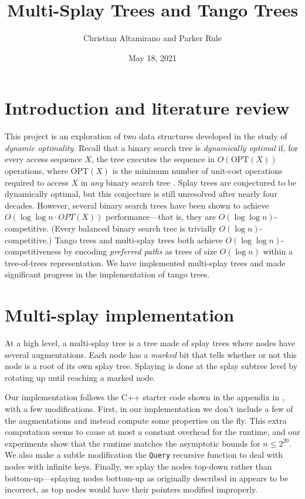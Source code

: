 \documentclass{article}
\title{Multi-Splay Trees and Tango Trees}
\author{Christian Altamirano and Parker Rule}
\date{May 18, 2021}
\newcommand{\OPT}{\text{OPT}}
\begin{document}
\maketitle

\section{Introduction and literature review}
This project is an exploration of two data structures developed in the study of \emph{dynamic optimality}. Recall that a binary search tree is \emph{dynamically optimal} if, for every access sequence $X$, the tree executes the sequence in $O(\OPT(X))$ operations, where $\OPT(X)$ is the minimum number of unit-cost operations required to access $X$ in \emph{any} binary search tree \cite{demaine2007dynamic}. Splay trees \cite{sleator1985self} are conjectured to be dynamically optimal, but this conjecture is still unresolved after nearly four decades. However, several binary search trees have been shown to achieve $O(\log \log n \cdot OPT(X))$ performance---that is, they are $O(\log \log n)$-competitive. (Every balanced binary search tree is trivially $O(\log n)$-competitive.) Tango trees \cite{demaine2007dynamic} and multi-splay trees \cite{sleator2004dynamic, daniel2006log, derryberry2009properties} both achieve $O(\log \log n)$-competitiveness by encoding \emph{preferred paths} as trees of size $O(\log n)$ within a tree-of-trees representation. We have implemented multi-splay trees and made significant progress in the implementation of tango trees.

\section{Multi-splay implementation}
At a high level, a multi-splay tree is a tree made of splay trees where nodes have several augmentations. Each node has a \textit{marked} bit that tells whether or not this node is a root of its own splay tree. Splaying is done at the splay subtree level by rotating up until reaching a marked node.

Our implementation follows the C++ starter code shown in the appendix in \cite{sleator2004dynamic}, with a few modifications. First, in our implementation we don't include a few of the augmentations and instead compute some properties on the fly. This extra computation seems to cause at most a constant overhead for the runtime, and our experiments show that the runtime matches the asymptotic bounds for $n \leq 2^{20}$. We also make a subtle modification the \texttt{Query} recursive function to deal with nodes with infinite keys. Finally, we splay the nodes top-down rather than bottom-up---splaying nodes bottom-up as originally described in \cite{sleator2004dynamic} appears to be incorrect, as top nodes would have their pointers modified improperly.
\end{document}
